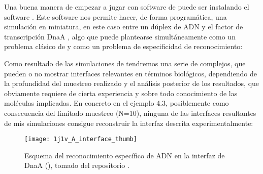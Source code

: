 Una buena manera de empezar a jugar con software de  puede ser instalando el software 
 \citep{Chaudhury2010}. Este software nos permite hacer,
de forma program\'{a}tica, una simulaci\'{o}n  en miniatura, en este caso entre un d\'{u}plex de ADN y 
el factor de transcripci\'{o}n DnaA , algo que puede plantearse simult\'{a}neamente como un problema cl\'{a}sico 
de  y como un problema de especificidad de reconocimiento:


Como resultado de las simulaciones de  tendremos una serie de complejos, que pueden o no
mostrar interfaces relevantes en t\'{e}rminos biol\'{o}gicos, dependiendo de la profundidad del muestreo realizado
y el an\'{a}lisis posterior de los resultados, que obviamente requiere de cierta experiencia y sobre todo conocimiento
de las mol\'{e}culas implicadas. 
En concreto en el ejemplo 4.3, posiblemente como consecuencia del limitado muestreo (N=10), ninguna de las 
interfaces resultantes de mis simulaciones  consigue
reconstruir la interfaz descrita experimentalmente:

\begin{figure}
\begin{center} 
\texttt{[image: 1j1v\_A\_interface\_thumb]}
\caption%
{
Esquema del reconocimiento espec\'{i}fico de ADN en la interfaz de DnaA 
(), tomado del repositorio
.
}
\label{fig:dnaA_intf}
\end{center}
\end{figure}

%

